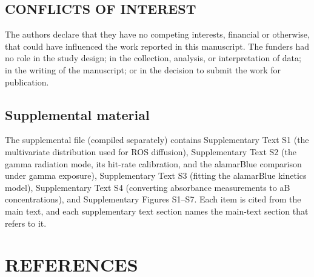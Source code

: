 \documentclass{asmarticle}
\begin{document}
\begin{conflictsinterest}
\section{CONFLICTS OF INTEREST}
The authors declare that they have no competing interests, financial or otherwise, that could have influenced the work reported in this manuscript. The funders had no role in the study design; in the collection, analysis, or interpretation of data; in the writing of the manuscript; or in the decision to submit the work for publication.
\end{conflictsinterest}


\subsection{Supplemental material}
The supplemental file (compiled separately) contains Supplementary Text S1 (the multivariate distribution used for ROS diffusion), Supplementary Text S2 (the gamma radiation mode, its hit-rate calibration, and the alamarBlue comparison under gamma exposure), Supplementary Text S3 (fitting the alamarBlue kinetics model), Supplementary Text S4 (converting absorbance measurements to aB concentrations), and Supplementary Figures S1--S7. Each item is cited from the main text, and each supplementary text section names the main-text section that refers to it.

\section{REFERENCES}


\end{document}
